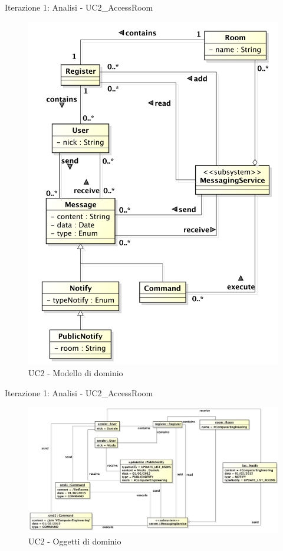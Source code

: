 \begin{frame} {Iterazione 1: Analisi - UC2\_AccessRoom}
   \begin{figure}
     \includegraphics[scale=0.165]{image_astah/Iteration_1_DomainModel/UC2_AccessRoom_DM.png}{\centering}
     \caption{UC2 - Modello di dominio}
     \label{fig_UC2_AR_DM} 
   \end{figure}
\end{frame}

\begin{frame} {Iterazione 1: Analisi - UC2\_AccessRoom}
   \begin{figure}
     \includegraphics[scale=0.17]{image_astah/Iteration_1_DomainModel/UC2_AccessRoom_OM}{\centering}
     \caption{UC2 - Oggetti di dominio}
     \label{fig_UC2_AR_OM} 
   \end{figure}
\end{frame}

